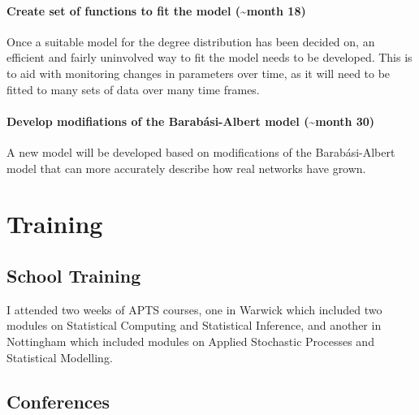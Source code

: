 \documentclass[
  10pt,
  a4paper,
]{scrreprt}
\theoremstyle{plain}
\theoremstyle{definition}
\theoremstyle{plain}
\theoremstyle{remark}
\begin{document}
{\hypertarget{create-set-of-functions-to-fit-the-model-month-18}{%
\subsubsection*{Create set of functions to fit the model
(\textasciitilde month
18)}\label{create-set-of-functions-to-fit-the-model-month-18}}

Once a suitable model for the degree distribution has been decided on,
an efficient and fairly uninvolved way to fit the model needs to be
developed. This is to aid with monitoring changes in parameters over
time, as it will need to be fitted to many sets of data over many time
frames.

\hypertarget{develop-modifiations-of-the-barabuxe1si-albert-model-month-30}{%
\subsubsection*{Develop modifiations of the Barabási-Albert model
(\textasciitilde month
30)}\label{develop-modifiations-of-the-barabuxe1si-albert-model-month-30}}

A new model will be developed based on modifications of the
Barabási-Albert model that can more accurately describe how real
networks have grown.

\hypertarget{training}{%
\chapter{Training}\label{training}}

\hypertarget{school-training}{%
\section{School Training}\label{school-training}}

I attended two weeks of APTS courses, one in Warwick which included two
modules on Statistical Computing and Statistical Inference, and another
in Nottingham which included modules on Applied Stochastic Processes and
Statistical Modelling.

\hypertarget{conferences}{%
\section{Conferences}\label{conferences}}

}
\end{document}
